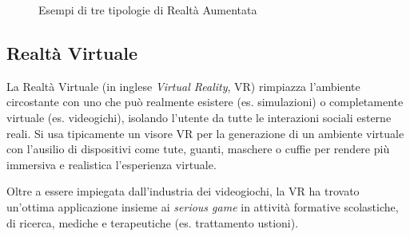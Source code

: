\begin{figure}  [h]
    \centering
    \caption{Esempi di tre tipologie di Realtà Aumentata} 
    \label{fig:ARbased_type}
\end{figure}

\subsection{Realtà Virtuale}
\label{sec:vr}
La Realtà Virtuale (in inglese \textit{Virtual Reality}, VR) rimpiazza l'ambiente circostante con uno che può realmente esistere (es. simulazioni) o completamente virtuale (es. videogichi), isolando l'utente da tutte le interazioni sociali esterne reali. Si usa tipicamente un visore VR per la generazione di un ambiente virtuale con l'ausilio di dispositivi come tute, guanti, maschere o cuffie per rendere più immersiva e realistica l'esperienza virtuale.

Oltre a essere impiegata dall'industria dei videogiochi, la VR ha trovato un'ottima applicazione insieme ai \textit{serious game} in attività formative scolastiche, di ricerca, mediche e terapeutiche (es. trattamento ustioni).

